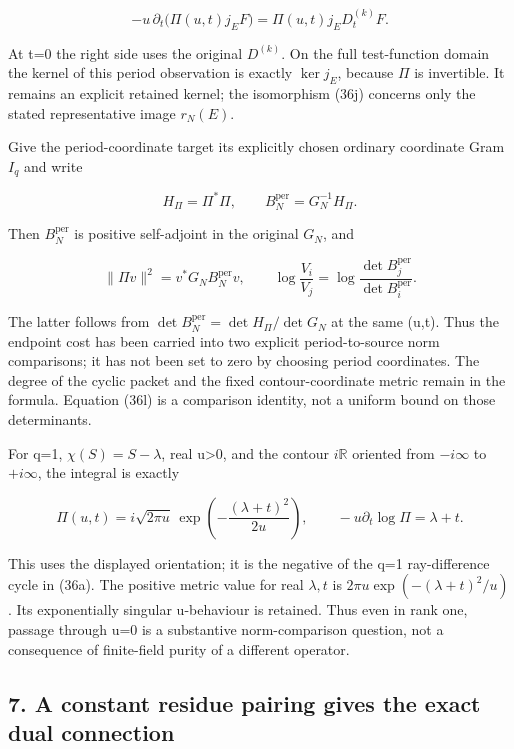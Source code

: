 \documentclass[
  11pt,
]{article}
\begin{document}
\[
\boxed{-u\,\partial_t\bigl(\Pi(u,t)j_EF\bigr)
=\Pi(u,t)j_ED_t^{(k)}F.}
\tag{36j.1}
\]

At t=0 the right side uses the original \(D^{(k)}\). On the full
test-function domain the kernel of this period observation is exactly
\(\ker j_E\), because \(\Pi\) is invertible. It remains an explicit
retained kernel; the isomorphism (36j) concerns only the stated
representative image \(r_N(E)\).

Give the period-coordinate target its explicitly chosen ordinary
coordinate Gram \(I_q\) and write

\[
H_\Pi=\Pi^*\Pi,\qquad
B_N^{\mathrm{per}}=G_N^{-1}H_\Pi.
\tag{36k}
\]

Then \(B_N^{\mathrm{per}}\) is positive self-adjoint in the original
\(G_N\), and

\[
\|\Pi v\|^2=v^*G_NB_N^{\mathrm{per}}v,
\qquad
\boxed{\log\frac{V_i}{V_j}
=\log\frac{\det B_j^{\mathrm{per}}}{\det B_i^{\mathrm{per}}}.}
\tag{36l}
\]

The latter follows from \(\det B_N^{\mathrm{per}}=\det H_\Pi/\det G_N\)
at the same (u,t). Thus the endpoint cost has been carried into two
explicit period-to-source norm comparisons; it has not been set to zero
by choosing period coordinates. The degree of the cyclic packet and the
fixed contour-coordinate metric remain in the formula. Equation (36l) is
a comparison identity, not a uniform bound on those determinants.

For q=1, \(\chi(S)=S-\lambda\), real u\textgreater0, and the contour
\(i\mathbb R\) oriented from \(-i\infty\) to \(+i\infty\), the integral
is exactly

\[
\boxed{\Pi(u,t)=i\sqrt{2\pi u}\,
\exp\!\left(-\frac{(\lambda+t)^2}{2u}\right),
\qquad -u\partial_t\log\Pi=\lambda+t.}
\tag{36m}
\]

This uses the displayed orientation; it is the negative of the q=1
ray-difference cycle in (36a). The positive metric value for real
\(\lambda,t\) is \(2\pi u\exp(- (\lambda+t)^2/u)\). Its exponentially
singular u-behaviour is retained. Thus even in rank one, passage through
u=0 is a substantive norm-comparison question, not a consequence of
finite-field purity of a different operator.

\subsection{7. A constant residue pairing gives the exact dual
connection}\label{a-constant-residue-pairing-gives-the-exact-dual-connection}
\end{document}
